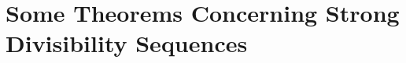 
\section[Concerning Strong Divisibility Sequences]{Some Theorems Concerning Strong Divisibility Sequences}

